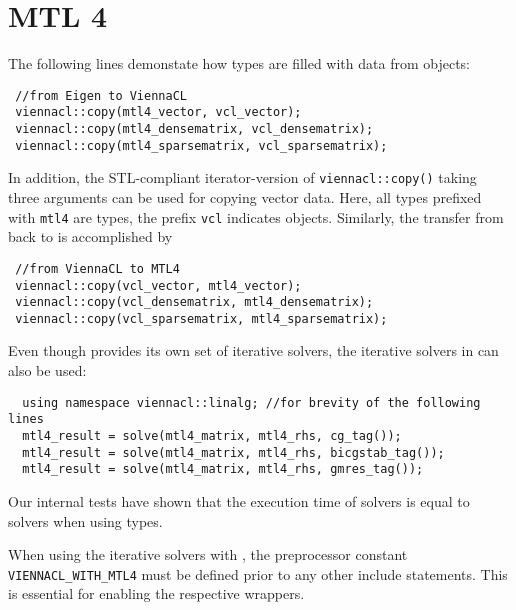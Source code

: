 \section{MTL 4}
The following lines demonstate how {\ViennaCL} types are filled with data from {\MTL} \cite{mtl4} objects:
\begin{lstlisting}
 //from Eigen to ViennaCL
 viennacl::copy(mtl4_vector, vcl_vector);
 viennacl::copy(mtl4_densematrix, vcl_densematrix);
 viennacl::copy(mtl4_sparsematrix, vcl_sparsematrix);
\end{lstlisting}
In addition, the STL-compliant iterator-version of \texttt{viennacl::copy()} taking three arguments can be used for copying vector data.
Here, all types prefixed with \texttt{mtl4} are {\MTL} types, the prefix \texttt{vcl} indicates {\ViennaCL} objects.
Similarly, the transfer from {\ViennaCL} back to {\MTL} is accomplished by
\begin{lstlisting}
 //from ViennaCL to MTL4
 viennacl::copy(vcl_vector, mtl4_vector);
 viennacl::copy(vcl_densematrix, mtl4_densematrix);
 viennacl::copy(vcl_sparsematrix, mtl4_sparsematrix);
\end{lstlisting}

Even though {\MTL} provides its own set of iterative solvers, the iterative solvers in {\ViennaCL} can also be used:
\begin{lstlisting}
  using namespace viennacl::linalg; //for brevity of the following lines
  mtl4_result = solve(mtl4_matrix, mtl4_rhs, cg_tag());
  mtl4_result = solve(mtl4_matrix, mtl4_rhs, bicgstab_tag());
  mtl4_result = solve(mtl4_matrix, mtl4_rhs, gmres_tag());
\end{lstlisting}
Our internal tests have shown that the execution time of {\MTL} solvers is equal to {\ViennaCL} solvers when using {\MTL} types.

When using the iterative solvers with {\MTL}, the preprocessor constant \texttt{VIENNACL\_WITH\_MTL4} must be defined prior to any other {\ViennaCL} include statements.
This is essential for enabling the respective wrappers.

